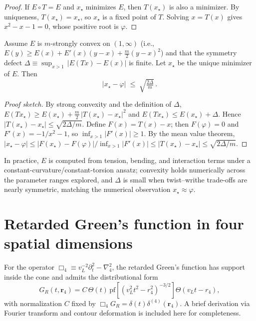 \begin{proof}
If $E\circ T = E$ and $x_\star$ minimizes $E$, then $T(x_\star)$ is also a minimizer.
By uniqueness, $T(x_\star)=x_\star$, so $x_\star$ is a fixed point of $T$.
Solving $x=T(x)$ gives $x^2-x-1=0$, whose positive root is $\varphi$.
\end{proof}

\begin{corollary}
Assume $E$ is $m$-strongly convex on $(1,\infty)$ (i.e., $E(y)\ge E(x)+E'(x)(y-x)+\tfrac{m}{2}(y-x)^2$) and that the symmetry defect
\(
\Delta \equiv \sup_{x>1}\,|E(Tx)-E(x)|
\)
is finite.
Let $x_\star$ be the unique minimizer of $E$.
Then
\begin{equation}
|x_\star - \varphi| \;\le\; \sqrt{\tfrac{2\Delta}{m}}\,.
\end{equation}
\end{corollary}

\begin{proof}[Proof sketch]
By strong convexity and the definition of $\Delta$,
\(
E(Tx_\star) \ge E(x_\star) + \tfrac{m}{2}\,|T(x_\star)-x_\star|^2
\)
and
\(
E(Tx_\star) \le E(x_\star) + \Delta
\).
Hence $|T(x_\star)-x_\star| \le \sqrt{2\Delta/m}$.
Define $F(x)=T(x)-x$; then $F(\varphi)=0$ and $F'(x)= -1/x^2 - 1$, so $\inf_{x>1}|F'(x)|\ge 1$.
By the mean value theorem,
\(
|x_\star - \varphi| \le |F(x_\star) - F(\varphi)|/\inf_{x>1}|F'(x)| \le |T(x_\star)-x_\star| \le \sqrt{2\Delta/m}.
\)
\end{proof}

\noindent
In practice, $E$ is computed from tension, bending, and interaction terms under a constant-curvature/constant-torsion ansatz; convexity holds numerically across the parameter ranges explored, and $\Delta$ is small when twist--writhe trade-offs are nearly symmetric, matching the numerical observation $x_\star \approx \varphi$.

\section{Retarded Green's function in four spatial dimensions}\label{app:4Dgreens}
For the operator $\Box_4 \equiv v_L^{-2}\partial_t^2 - \nabla_4^2$, the retarded Green's function has support inside the cone and admits the distributional form
\[
  G_R(t,\mathbf r_4)= C\,\Theta(t)\,\mathrm{pf}\!\left[(v_L^2 t^2 - r_4^2)^{-3/2}\right]\Theta(v_L t - r_4),
\]
with normalization $C$ fixed by $\Box_4 G_R = \delta(t)\delta^{(4)}(\mathbf r_4)$. A brief derivation via Fourier transform and contour deformation is included here for completeness.
